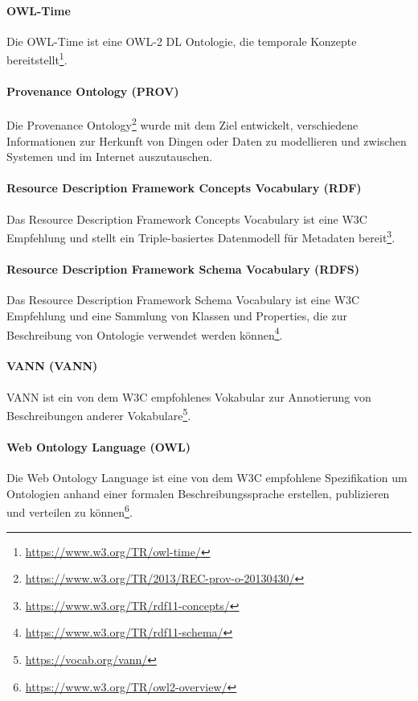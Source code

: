 \documentclass{article}
\begin{document}
\paragraph{OWL-Time} Die OWL-Time ist eine OWL-2 DL Ontologie, die temporale Konzepte bereitstellt\footnote{\url{https://www.w3.org/TR/owl-time/}}.

\paragraph{Provenance Ontology (PROV)}

Die Provenance Ontology\footnote{\url{https://www.w3.org/TR/2013/REC-prov-o-20130430/}} wurde mit dem Ziel entwickelt, verschiedene Informationen zur Herkunft von Dingen oder Daten zu modellieren und zwischen Systemen und im Internet auszutauschen.

\paragraph{Resource Description Framework Concepts Vocabulary (RDF)}

Das Resource Description Framework Concepts Vocabulary ist eine W3C Empfehlung und stellt ein Triple-basiertes Datenmodell für Metadaten bereit\footnote{\url{https://www.w3.org/TR/rdf11-concepts/}}.

\paragraph{Resource Description Framework Schema Vocabulary (RDFS)}

Das Resource Description Framework Schema Vocabulary ist eine W3C Empfehlung und eine Sammlung von Klassen und Properties, die zur Beschreibung von Ontologie verwendet werden können\footnote{\url{https://www.w3.org/TR/rdf11-schema/}}.

\paragraph{VANN (VANN)}

VANN ist ein von dem W3C empfohlenes Vokabular zur Annotierung von Beschreibungen anderer Vokabulare\footnote{\url{https://vocab.org/vann/}}.

\paragraph{Web Ontology Language (OWL)}

Die Web Ontology Language ist eine von dem W3C empfohlene Spezifikation um Ontologien anhand einer formalen Beschreibungssprache erstellen, publizieren und verteilen zu können\footnote{\url{https://www.w3.org/TR/owl2-overview/}}.
\end{document}
